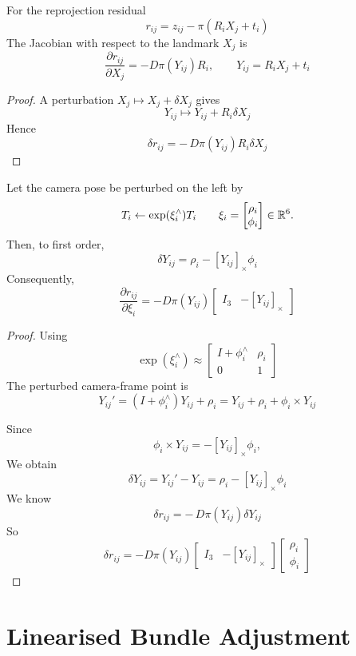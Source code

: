 \documentclass[11pt]{article}
\begin{document}
\begin{proposition}
For the reprojection residual
\[
r_{ij}=z_{ij}-\pi(R_iX_j+t_i)
\]
The Jacobian with respect to the landmark \(X_j\) is
\[
\frac{\partial r_{ij}}{\partial X_j}
=
-
D\pi(Y_{ij})R_i,
\qquad
Y_{ij}=R_iX_j+t_i
\]
\end{proposition}

\begin{proof}
A perturbation \(X_j\mapsto X_j+\delta X_j\) gives
\[
Y_{ij}\mapsto Y_{ij}+R_i\delta X_j
\]
Hence
\[
\delta r_{ij}
=
-\,D\pi(Y_{ij})R_i\delta X_j
\]
\end{proof}

\begin{proposition}
Let the camera pose be perturbed on the left by
\[
T_i\leftarrow \exp(\xi_i^\wedge)T_i
\qquad
\xi_i=
\begin{bmatrix}
\rho_i\\ \phi_i
\end{bmatrix}
\in\mathbb{R}^6.
\]
Then, to first order,
\[
\delta Y_{ij}
=
\rho_i-[Y_{ij}]_\times\phi_i
\]
Consequently,
\[
\frac{\partial r_{ij}}{\partial \xi_i}
=
-
D\pi(Y_{ij})
\begin{bmatrix}
I_3 & -[Y_{ij}]_\times
\end{bmatrix}
\]
\end{proposition}

\begin{proof}

Using
\[
\exp(\xi_i^\wedge)
\approx
\begin{bmatrix}
I+\phi_i^\wedge & \rho_i\\
0 & 1
\end{bmatrix}
\]
The perturbed camera-frame point is
\[
Y_{ij}'=(I+\phi_i^\wedge)Y_{ij}+\rho_i
=
Y_{ij}+\rho_i+\phi_i\times Y_{ij}
\]

Since
\[
\phi_i\times Y_{ij}=-[Y_{ij}]_\times\phi_i,
\]
We obtain
\[
\delta Y_{ij}
=
Y_{ij}'-Y_{ij}
=
\rho_i-[Y_{ij}]_\times\phi_i
\]
We know
\[
\delta r_{ij}
=
-\,D\pi(Y_{ij})\delta Y_{ij}
\]
So
\[
\delta r_{ij}
=
-
D \pi (Y_{ij})
\begin{bmatrix}
I_3 & -[Y_{ij}]_\times
\end{bmatrix}
\begin{bmatrix}
\rho_i\\ \phi_i
\end{bmatrix}
\]
\end{proof}


\section{Linearised Bundle Adjustment}
\end{document}
